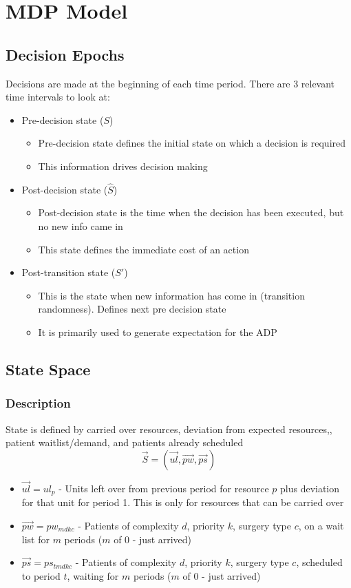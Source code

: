 \section{MDP Model}

\subsection{Decision Epochs}
Decisions are made at the beginning of each time period. There are 3 relevant time intervals to look at:
\begin{itemize}
	\item Pre-decision state ($S$)
	\begin{itemize}
		\item Pre-decision state defines the initial state on which a decision is required
		\item This information drives decision making
	\end{itemize}
	
	\item Post-decision state ($\hat{S}$)
	\begin{itemize}
		\item Post-decision state is the time when the decision has been executed, but no new info came in
		\item This state defines the immediate cost of an action
	\end{itemize} 
	
	\item Post-transition state ($S'$)
	\begin{itemize}
		\item This is the state when new information has come in (transition randomness). Defines next pre decision state
		\item It is primarily used to generate expectation for the ADP
	\end{itemize}
\end{itemize}

\subsection{State Space}
\subsubsection{Description}
State is defined by carried over resources, deviation from expected resources,, patient waitlist/demand, and patients already scheduled
\[  \vec{S}  = (\vec{ul}, \vec{pw}, \vec{ps}) \]
\begin{itemize}
	\item $\vec{ul} = ul_{p}$ - Units left over from previous period for resource $p$ plus deviation for that unit for period 1. This is only for resources that can be carried over
	\item $\vec{pw} = pw_{mdkc}$ - Patients of complexity $d$, priority $k$, surgery type $c$, on a wait list for $m$ periods ($m$ of 0 - just arrived)
	\item $\vec{ps} = ps_{tmdkc}$ - Patients of complexity $d$, priority $k$,  surgery type $c$, scheduled to period $t$, waiting for $m$ periods ($m$ of 0 - just arrived)
\end{itemize}

